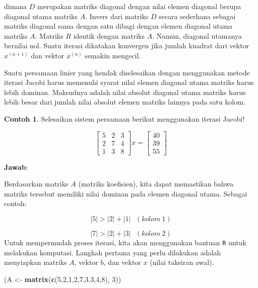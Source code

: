 \documentclass[
]{book}
\newenvironment{Shaded}{\begin{snugshade}}{\end{snugshade}}
\newcommand{\DecValTok}[1]{\textcolor[rgb]{0.00,0.00,0.81}{#1}}
\newcommand{\FunctionTok}[1]{\textcolor[rgb]{0.13,0.29,0.53}{\textbf{#1}}}
\newcommand{\NormalTok}[1]{#1}
\newcommand{\OtherTok}[1]{\textcolor[rgb]{0.56,0.35,0.01}{#1}}
\theoremstyle{definition}
\theoremstyle{definition}
\newtheorem{example}{Contoh}[chapter]
\theoremstyle{definition}
\theoremstyle{definition}
\theoremstyle{remark}
\begin{document}
dimana \(D\) merupakan matriks diagonal dengan nilai elemen diagonal berupa diagonal utama matriks \(A\). Invers dari matriks \(D\) secara sederhana sebagai matriks diagonal sama dengan satu dibagi dengan elemen diagonal utama matriks \(A\). Matriks \(R\) identik dengan matriks \(A\). Namun, diagonal utamanya bernilai nol. Suatu iterasi dikatakan konvergen jika jumlah kuadrat dari vektor \(x^{\left(n+1\right)}\) dan vektor \(x^{\left(n\right)}\) semakin mengecil.

Suatu persamaan linier yang hendak diselesaikan dengan menggunakan metode iterasi Jacobi harus memenuhi syarat nilai elemen diagonal utama matriks harus lebih dominan. Maksudnya adalah nilai absolut diagonal utama matriks harus lebih besar dari jumlah nilai absolut elemen matriks lainnya pada satu kolom.

\begin{example}
\protect\hypertarget{exm:jacobiexm}{}\label{exm:jacobiexm}Selesaikan sistem persamaan berikut menggunakan iterasi Jacobi!
\end{example}

\begin{equation*}
\begin{bmatrix}
     5 & 2 & 3     \\[0.3em]
     2 & 7 & 4     \\[0.3em]
     1 & 3 & 8
\end{bmatrix}
x = \begin{bmatrix}
     40     \\[0.3em]
     39     \\[0.3em]
     55
\end{bmatrix}
\end{equation*}

\textbf{Jawab}:

Berdasarkan matriks \(A\) (matriks koefisien), kita dapat memastikan bahwa matriks tersebut memiliki nilai dominan pada elemen diagonal utama. Sebagai contoh:

\[
\left|5\right|>\left|2\right|+\left|1\right|\ \ \ \left(kolom\ 1\right)
\]

\[
\left|7\right|>\left|2\right|+\left|3\right|\ \ \ \left(kolom\ 2\right)
\]
Untuk mempermudah proses iterasi, kita akan menggunakan bantuan \texttt{R} untuk melakukan komputasi. Langkah pertama yang perlu dilakukan adalah menyiapkan matriks \(A\), vektor \(b\), dan vektor \(x\) (nilai taksiran awal).

\begin{Shaded}
\begin{Highlighting}[]
\NormalTok{(A }\OtherTok{\textless{}{-}} \FunctionTok{matrix}\NormalTok{(}\FunctionTok{c}\NormalTok{(}\DecValTok{5}\NormalTok{,}\DecValTok{2}\NormalTok{,}\DecValTok{1}\NormalTok{,}\DecValTok{2}\NormalTok{,}\DecValTok{7}\NormalTok{,}\DecValTok{3}\NormalTok{,}\DecValTok{3}\NormalTok{,}\DecValTok{4}\NormalTok{,}\DecValTok{8}\NormalTok{), }\DecValTok{3}\NormalTok{))}
\end{Highlighting}
\end{Shaded}
\end{document}
